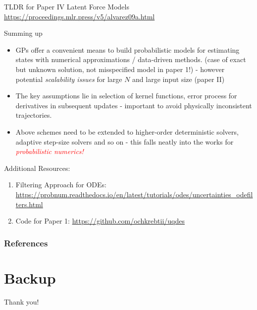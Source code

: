 \documentclass[usenames,dvipsnames]{beamer}
\theoremstyle{definition}
\let\oldcite=\cite
\renewcommand{\cite}[2][]{\textcolor{green}{\oldcite[#1]{#2}}}
\begin{document}
\begin{frame}{TLDR for Paper IV}
    Latent Force Models \url{https://proceedings.mlr.press/v5/alvarez09a.html} \cite{pmlr-v5-alvarez09a}
\end{frame}

\begin{frame}{Summing up}
\begin{itemize}
\item GPs offer a convenient means to build probabilistic models for estimating states with numerical approximations / data-driven methods. (case of exact but unknown solution, not misspecified model in paper 1!) - however potential \emph{scalability issues} for large $N$ and large input size (paper II)

\item The key assumptions lie in selection of kernel functions, error process for derivatives in subsequent updates - important to avoid physically inconsistent trajectories.

\item Above schemes need to be extended to higher-order deterministic solvers, adaptive step-size solvers and so on - this falls neatly into the works for \textcolor{red}{\emph{probabilistic numerics!}}
\end{itemize}
\end{frame}


\begin{frame}{Additional Resources:}
\begin{enumerate}
    \item Filtering Approach for ODEs: \url{https://probnum.readthedocs.io/en/latest/tutorials/odes/uncertainties_odefilters.html}
    
    \item Code for Paper 1: \url{https://github.com/ochkrebtii/uqdes}
\end{enumerate}
\end{frame}


\begin{frame}[allowframebreaks]
    \frametitle{References}
    

    
\end{frame}

\section{Backup}
\begin{frame}{}
\begin{center}
    \Large{Thank you!}
\end{center}
        
\end{frame}


\end{document}
